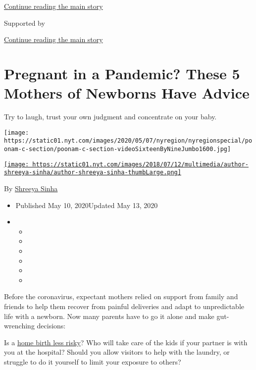 \protect\hyperlink{after-top}{Continue reading the main story}

Supported by

\protect\hyperlink{after-sponsor}{Continue reading the main story}

\hypertarget{pregnant-in-a-pandemic-these-5-mothers-of-newborns-have-advice}{%
\section{Pregnant in a Pandemic? These 5 Mothers of Newborns Have
Advice}\label{pregnant-in-a-pandemic-these-5-mothers-of-newborns-have-advice}}

Try to laugh, trust your own judgment and concentrate on your baby.

\texttt{[image: https://static01.nyt.com/images/2020/05/07/nyregion/nyregionspecial/poonam-c-section/poonam-c-section-videoSixteenByNineJumbo1600.jpg]}

\href{https://www.nytimes.com/by/shreeya-sinha}{\texttt{[image: https://static01.nyt.com/images/2018/07/12/multimedia/author-shreeya-sinha/author-shreeya-sinha-thumbLarge.png]}}

By \href{https://www.nytimes.com/by/shreeya-sinha}{Shreeya Sinha}

\begin{itemize}
\item
  Published May 10, 2020Updated May 13, 2020
\item
  \begin{itemize}
  \item
  \item
  \item
  \item
  \item
  \item
  \end{itemize}
\end{itemize}

Before the coronavirus, expectant mothers relied on support from family
and friends to help them recover from painful deliveries and adapt to
unpredictable life with a newborn. Now many parents have to go it alone
and make gut-wrenching decisions:

Is a
\href{https://www.nytimes.com/2020/03/30/parenting/home-birth-coronavirus-hospital.html}{home
birth less risky}? Who will take care of the kids if your partner is
with you at the hospital? Should you allow visitors to help with the
laundry, or struggle to do it yourself to limit your exposure to others?

